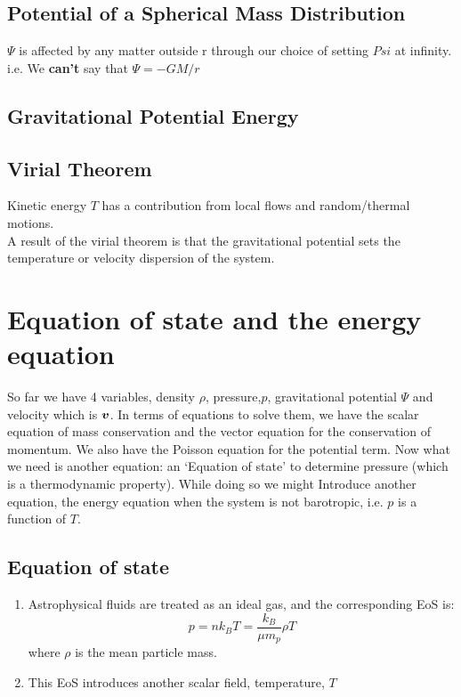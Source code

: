 \documentclass[12pt,a4paper]{article}
\begin{document}
\subsection{Potential of a Spherical Mass Distribution}
$\Psi$ is affected by any matter outside r through our choice of setting $Psi$ at infinity. 
i.e. We \textbf{can't} say that $\Psi = -GM/r$

\subsection{Gravitational Potential Energy}
\subsection{Virial Theorem}
Kinetic energy $T$ has a contribution from local flows and random/thermal motions.\\
A result of the virial theorem is that the gravitational potential sets the temperature or velocity dispersion of the system.
\section{Equation of state and the energy equation}
So far we have 4 variables, density $\rho$, pressure,$p$, gravitational potential $\Psi$ and velocity which is $\vb*{v}$.
In terms of equations to solve them, we have the scalar equation of mass conservation and the vector equation for the conservation of momentum. We also have the Poisson equation for the potential term.
Now what we need is another equation: an `Equation of state' to determine pressure (which is a thermodynamic property). While doing so we might Introduce another equation, the energy equation when the system is not barotropic, i.e. $p$ is a function of $T$.
\subsection{Equation of state}
    \begin{enumerate}
        \item Astrophysical fluids are treated as an ideal gas, and the corresponding EoS is:
        \begin{equation}
            p=nk_B T =\frac{k_B}{\mu m_p}\rho T
        \end{equation}
        where $\rho$ is the mean particle mass.
        \item This EoS introduces another scalar field, temperature, $T$
    \end{enumerate}
\end{document}
